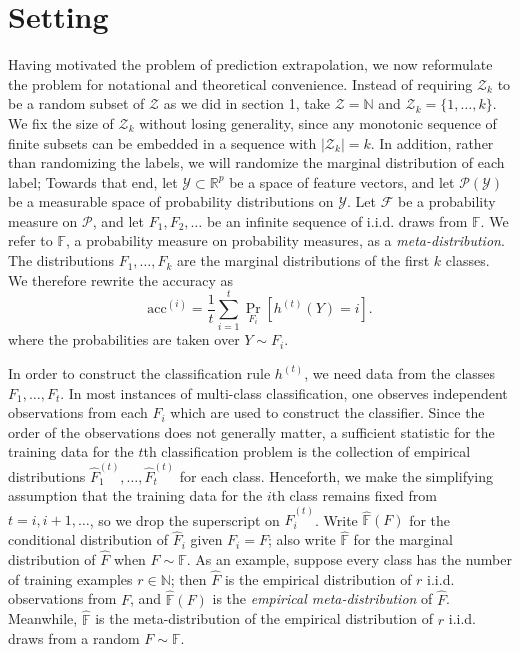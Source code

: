 \documentclass{article}
\begin{document}
\section{Setting}

Having motivated the problem of prediction extrapolation,
we now reformulate the problem for notational and theoretical convenience.
Instead of requiring $\mathcal{Z}_k$ to be a random subset of $\mathcal{Z}$ as we did in section 1, take
$\mathcal{Z}=\mathbb{N}$ and $\mathcal{Z}_k = \{1,\hdots, k\}$.
We fix the size of $\mathcal{Z}_k$ without losing generality, since any monotonic sequence of 
finite subsets can be embedded in a sequence with $|\mathcal{Z}_k| = k$.
In addition, rather than randomizing the labels, we will randomize the marginal distribution of each label;
Towards that end, let $\mathcal{Y} \subset \mathbb{R}^p$ be a space of feature vectors, and
let $\mathcal{P}(\mathcal{Y})$ be a measurable space of probability distributions on $\mathcal{Y}$.
Let $\mathcal{F}$ be a probability measure on $\mathcal{P}$,
and let $F_1, F_2,\hdots$ be an infinite sequence of i.i.d. draws from $\mathbb{F}$.
We refer to $\mathbb{F}$, a probability measure on probability measures, as a \emph{meta-distribution}.
The distributions $F_1,\hdots, F_k$ are the marginal distributions of the first $k$ classes.
We therefore rewrite the accuracy as
\[
\text{acc}^{(i)} = \frac{1}{t}\sum_{i=1}^t \Pr_{F_i}[h^{(t)}(Y) = i].
\]
where the probabilities are taken over $Y \sim F_i$.

In order to construct the classification rule $h^{(t)}$, we need data from the classes $F_1,\hdots, F_t$.
In most instances of multi-class classification, one observes independent observations from each $F_i$
which are used to construct the classifier.  Since the order of the observations
does not generally matter, a sufficient statistic for the training data for the $t$th classification problem
is the collection of empirical distributions
$\hat{F}_1^{(t)},\hdots,\hat{F}_t^{(t)}$ for each class.
Henceforth, we make the simplifying assumption that the training data for the $i$th class remains fixed
from $t =i, i+1,\hdots$, so we drop the superscript on $\hat{F}_i^{(t)}$.
Write $\hat{\mathbb{F}}(F)$ for the conditional distribution of $\hat{F}_i$ given  $F_i = F$;
also write $\hat{\mathbb{F}}$ for the marginal distribution of $\hat{F}$ when $F \sim \mathbb{F}.$
As an example, suppose every class has the number of training examples $r \in \mathbb{N}$; then $\hat{F}$
is the empirical distribution of $r$ i.i.d. observations from $F$, and $\hat{\mathbb{F}}(F)$ is the \emph{empirical meta-distribution} of $\hat{F}$.
Meanwhile, $\hat{\mathbb{F}}$ is the meta-distribution of the empirical distribution of $r$ i.i.d. draws from a random $F \sim \mathbb{F}$.
\end{document}
